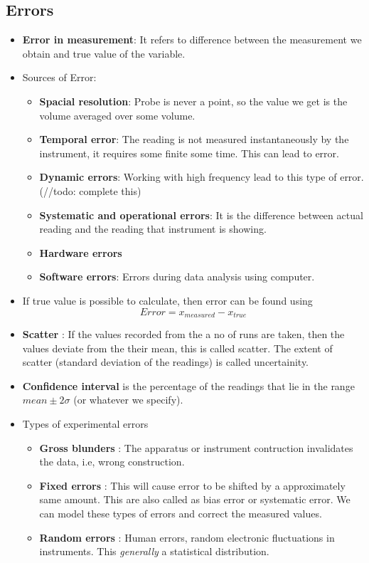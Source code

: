 \documentclass{article}
\begin{document}
	\subsection{Errors}
		\begin{itemize}
		\item \textbf{Error in measurement}: It refers to difference between the measurement we obtain and true value of the variable.
		\item {Sources of Error}:
			\begin{itemize}
				\item \textbf{Spacial resolution}: Probe is never a point, so the value we get is the volume averaged over some volume.
				\item \textbf{Temporal error}: The reading is not measured instantaneously by the instrument, it requires some finite some time. This can lead to error. 
				\item \textbf{Dynamic errors}: Working with high frequency lead to this type of error. (//todo: complete this)
				\item \textbf{Systematic and operational errors}: It is the difference between actual reading and the reading that instrument is showing.
				\item \textbf{Hardware errors}
				\item \textbf{Software errors}: Errors during data analysis using computer.
			\end{itemize}

		\item If true value is possible to calculate, then error can be found using
			\[Error = x_{measured}- x_{true}\]

		\item \textbf{Scatter} : If the values recorded from the a no of runs are taken, then the values deviate from the their mean, this is called scatter. The extent of scatter (standard deviation of the readings) is called uncertainity.
		\item \textbf{Confidence interval} is the percentage of the readings that lie in the range $mean \pm 2 \sigma$ (or whatever we specify).
		\item Types of experimental errors
			\begin{itemize}
			\item \textbf{Gross blunders} : The apparatus or instrument contruction invalidates the data, i.e, wrong construction.
			\item \textbf{Fixed errors} : This will cause error to be shifted by a approximately same amount. This are also called as bias error or systematic error. We can model these types of errors and correct the measured values.
			\item \textbf{Random errors} : Human errors, random electronic fluctuations in instruments. This \emph{generally} a statistical distribution.
			\end{itemize}
		\end{itemize}
\end{document}
